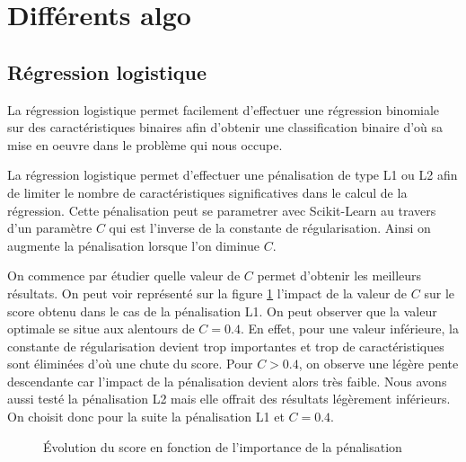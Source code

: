 \documentclass[11pt,a4paper]{article}
\begin{document}
\section{Différents algo}
	\subsection{Régression logistique}
		La régression logistique permet facilement d'effectuer une régression binomiale sur des caractéristiques binaires afin d'obtenir une classification binaire d'où sa mise en oeuvre dans le problème qui nous occupe.

		La régression logistique permet d'effectuer une pénalisation de type L1 ou L2 afin de limiter le nombre de caractéristiques significatives dans le calcul de la régression. Cette pénalisation peut se parametrer avec Scikit-Learn au travers d'un paramètre $C$ qui est l'inverse de la constante de régularisation. Ainsi on augmente la pénalisation lorsque l'on diminue $C$.

		On commence par étudier quelle valeur de $C$ permet d'obtenir les meilleurs résultats. On peut voir représenté sur la figure \ref{fig:l1_C} l'impact de la valeur de $C$ sur le score obtenu dans le cas de la pénalisation L1. On peut observer que la valeur optimale se situe aux alentours de $C=0.4$. En effet, pour une valeur inférieure, la constante de régularisation devient trop importantes et trop de caractéristiques sont éliminées d'où une chute du score. Pour $C>0.4$, on observe une légère pente descendante car l'impact de la pénalisation devient alors très faible. Nous avons aussi testé la pénalisation L2 mais elle offrait des résultats légèrement inférieurs. On choisit donc pour la suite la pénalisation L1 et $C=0.4$.

		\begin{figure}
			\begin{center}
			\caption{\'Evolution du score en fonction de l'importance de la pénalisation\label{fig:l1_C}}
			\end{center}
		\end{figure}
\end{document}
